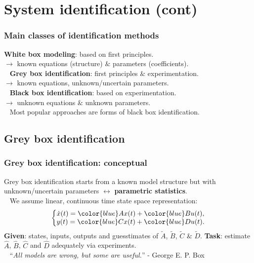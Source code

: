 \documentclass{beamer}
\begin{document}
\section{System identification (cont)}
\begin{frame}
\frametitle{Main classes of identification methods}
\textbf{White box modeling}: based on first principles. \\
\pause
$\rightarrow$ known equations (structure) $\&$ parameters (coefficients). \\
\ \newline
\pause
\textbf{Grey box identification}: first principles $\&$ experimentation. \\
\pause
$\rightarrow$ known equations, unknown/uncertain parameters. \\
\ \newline
\pause
\textbf{Black box identification}: based on experimentation. \\
\pause
$\rightarrow$ unknown equations $\&$ unknown parameters. \\
\ \newline
\pause
Most popular approaches are forms of black box identification.
\end{frame}

\subsection{Grey box identification}
\begin{frame}
\frametitle{Grey box identification: conceptual}
\pause
Grey box identification starts from a known model structure but with unknown/uncertain parameters $\leftrightarrow$ \textbf{parametric statistics}. \\
\pause
\ \newline
We assume linear, continuous time state space representation:
\begin{align*}
\left\{ \begin{matrix} 
\dot{x}(t) = {\color{blue}A}x(t) + {\color{blue}B}u(t), \\ 
y(t) = {\color{blue}C}x(t) + {\color{blue}D}u(t).
\end{matrix}\right.
\end{align*}
\pause
\textbf{Given}: states, inputs, outputs and guesstimates of $\tilde{A}$, $\tilde{B}$, $\tilde{C}$ $\&$ $\tilde{D}$.
\pause
\textbf{Task}: estimate $\hat{A}$, $\hat{B}$, $\hat{C}$ and $\hat{D}$ adequately via experiments.\\
\ \newline
\pause
``\emph{All models are wrong, but some are useful.}'' \hfill - George E. P. Box
\end{frame}
\end{document}
